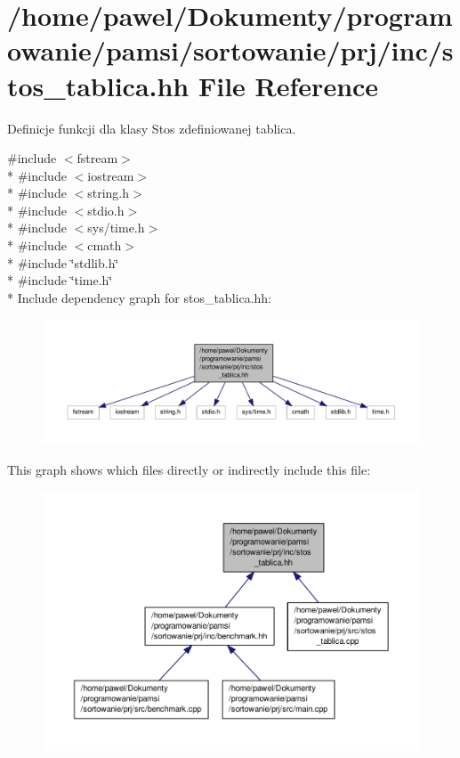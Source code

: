 \hypertarget{stos__tablica_8hh}{\section{/home/pawel/\-Dokumenty/programowanie/pamsi/sortowanie/prj/inc/stos\-\_\-tablica.hh File Reference}
\label{stos__tablica_8hh}
}


Definicje funkcji dla klasy Stos zdefiniowanej tablica.  


{\ttfamily \#include $<$fstream$>$}\\*
{\ttfamily \#include $<$iostream$>$}\\*
{\ttfamily \#include $<$string.\-h$>$}\\*
{\ttfamily \#include $<$stdio.\-h$>$}\\*
{\ttfamily \#include $<$sys/time.\-h$>$}\\*
{\ttfamily \#include $<$cmath$>$}\\*
{\ttfamily \#include \char`\"{}stdlib.\-h\char`\"{}}\\*
{\ttfamily \#include \char`\"{}time.\-h\char`\"{}}\\*
Include dependency graph for stos\-\_\-tablica.\-hh\-:\nopagebreak
\begin{figure}[H]
\begin{center}
\leavevmode
\includegraphics[width=350pt]{stos__tablica_8hh__incl}
\end{center}
\end{figure}
This graph shows which files directly or indirectly include this file\-:\nopagebreak
\begin{figure}[H]
\begin{center}
\leavevmode
\includegraphics[width=350pt]{stos__tablica_8hh__dep__incl}
\end{center}
\end{figure}
